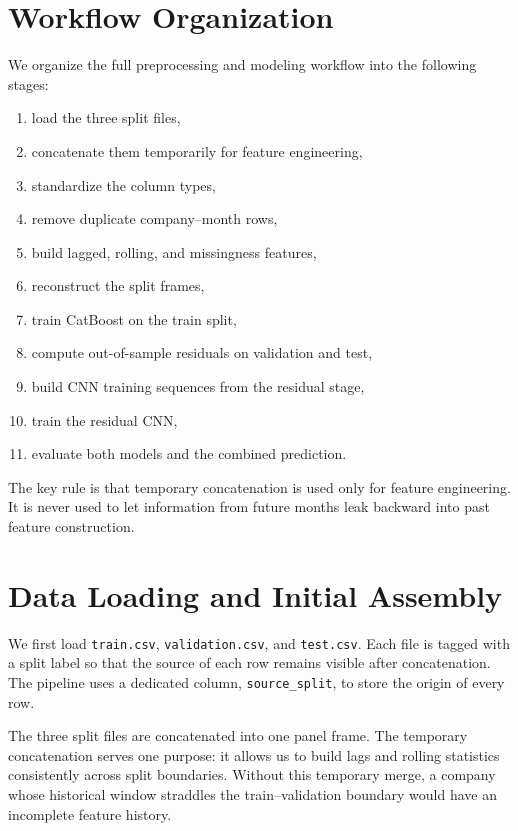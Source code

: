 \documentclass[11pt]{article}
\begin{document}
\section{Workflow Organization}

We organize the full preprocessing and modeling workflow into the following stages:
\begin{enumerate}
    \item load the three split files,
    \item concatenate them temporarily for feature engineering,
    \item standardize the column types,
    \item remove duplicate company--month rows,
    \item build lagged, rolling, and missingness features,
    \item reconstruct the split frames,
    \item train CatBoost on the train split,
    \item compute out-of-sample residuals on validation and test,
    \item build CNN training sequences from the residual stage,
    \item train the residual CNN,
    \item evaluate both models and the combined prediction.
\end{enumerate}

The key rule is that temporary concatenation is used only for feature engineering. It is never used to let information from future months leak backward into past feature construction.

\section{Data Loading and Initial Assembly}

We first load \texttt{train.csv}, \texttt{validation.csv}, and \texttt{test.csv}. Each file is tagged with a split label so that the source of each row remains visible after concatenation. The pipeline uses a dedicated column, \texttt{source\_split}, to store the origin of every row.

The three split files are concatenated into one panel frame. The temporary concatenation serves one purpose: it allows us to build lags and rolling statistics consistently across split boundaries. Without this temporary merge, a company whose historical window straddles the train--validation boundary would have an incomplete feature history.
\end{document}
